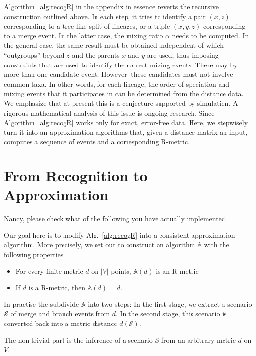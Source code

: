 \documentclass[amsmath]{lni}
\newcommand{\TODO}[1]{\begingroup\color{red}#1\endgroup}
\begin{document}
Algorithm~\ref{alg:recogR} \cite{Prohaska:17a} in the appendix in essence
reverts the recursive construction outlined above. In each step, it tries
to identify a pair $(x,z)$ corresponding to a tree-like split of lineages,
or a triple $(x,y,z)$ corresponding to a merge event. In the latter case,
the mixing ratio $\alpha$ needs to be computed. In the general case, the
same result must be obtained independent of which ``outgroups'' beyond $z$
and the parents $x$ and $y$ are used, thus imposing constraints that are
used to identify the correct mixing events. There may by more than one
candidate event. However, these candidates must not involve common taxa. In
other words, for each lineage, the order of speciation and mixing events
that it participates in can be determined from the distance data. We
emphasize that at present this is a conjecture supported by simulation. A
rigorous mathematical analysis of this issue is ongoing research.  Since
Algorithm~\ref{alg:recogR} works only for exact, error-free data. Here, we
stepwisely turn it into an approximation algorithms that, given a distance
matrix an input, computes a sequence of events and a corresponding
R-metric.

\section{From Recognition to Approximation} 





\TODO{Nancy, please check what of the following you have actually
  implemented.} 


Our goal here is to modify Alg.~\ref{alg:recogR} into a consistent
approximation algorithm. More precisely, we set out to construct an
algorithm $\mathbb{A}$ with the following properties:
\begin{itemize} 
  \item For every finite metric $d$ on $|V|$ points, $\mathbb{A}(d)$ 
    is an R-metric
  \item If $d$ is a R-metric, then $\mathbb{A}(d)=d$.
\end{itemize} 
In practise the subdivide $\mathbb{A}$ into two steps: In the first stage,
we extract a scenario $\mathcal{S}$ of merge and branch events from $d$. In
the second stage, this scenario is converted back into a metric distance
$d(\mathcal{S})$.

The non-trivial part is the inference of a scenario $\mathcal{S}$ from an
arbitrary metric $d$ on $V$.
\end{document}
